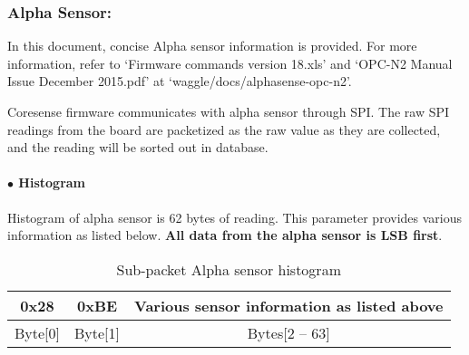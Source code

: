 
\subsubsection{Alpha Sensor:}
In this document, concise Alpha sensor information is provided. For more information, refer to `Firmware commands version 18.xls' and `OPC-N2 Manual Issue December 2015.pdf' at `waggle/docs/alphasense-opc-n2'.

Coresense firmware communicates with alpha sensor through SPI.
The raw SPI readings from the board are packetized as the raw value as they are collected, and the reading will be sorted out in database.

\paragraph{$\bullet$ Histogram}
Histogram of alpha sensor is 62 bytes of reading. This parameter provides various information as listed below. \textbf{All data from the alpha sensor is LSB first}.

\begin{table}[h!]
    \centering
    \caption{Sub-packet Alpha sensor histogram}
    \begin{tabular}{|c|c|c|}
        \hline
        \rowcolor{black!8}
        \textbf{0x28} & \textbf{0xBE} & \textbf{Various sensor information as listed above}\\
        \hline
        Byte[0] & Byte[1] & Bytes[2 -- 63] \\ \hline
    \end{tabular}
\end{table}


